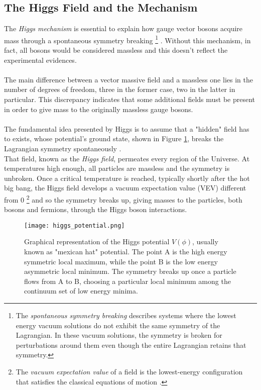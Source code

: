 \subsection{The Higgs Field and the Mechanism}
The \emph{Higgs mechanism} is essential to explain how gauge vector bosons acquire mass through a spontaneous symmetry breaking
\footnote{The \emph{spontaneous symmetry breaking} describes systems where the lowest energy vacuum solutions do not exhibit the same symmetry of the Lagrangian. In these vacuum solutions, the symmetry is broken for perturbations around them even though the entire Lagrangian retains that symmetry.}
. Without this mechanism, in fact, all bosons would be considered massless and this doesn't reflect the experimental evidences. 
\\\\
The main difference between a vector massive field and a massless one lies in the number of degrees of freedom, three in the former case, two in the latter in particular. This discrepancy indicates that some additional fields must be present in order to give mass to the originally massless gauge bosons.
\\\\
The fundamental idea presented by Higgs is to assume that a "hidden" field has to exists, whose potential's ground state, shown in Figure \ref{mexican_hat}, breaks the Lagrangian symmetry spontaneously \cite{Aitchison_Hey}.
\\
That field, known as the \emph{Higgs field}, permeates every region of the Universe. At temperatures high enough, all particles are massless and the symmetry is unbroken. Once a critical temperature is reached, typically shortly after the hot big bang, the Higgs field develops a vacuum expectation value (VEV) different from $0$
\footnote{The \emph{vacuum expectation value} of a field is the lowest-energy configuration that satisfies the classical equations of motion \cite{Schwartz:2013pla}.} and so the symmetry breaks up, giving masses to the particles, both bosons and fermions, through the Higgs boson interactions.
\begin{figure}[t]
\centering
\texttt{[image: higgs\_potential.png]}
\caption{Graphical representation of the Higgs potential $V(\phi)$, usually known as "mexican hat" potential. The point A is the high energy symmetric local maximum, while the point B is the low energy asymmetric local minimum. The symmetry breaks up once a particle flows from A to B, choosing a particular local minimum among the continuum set of low energy minima.}
\label{mexican_hat}
\end{figure}

